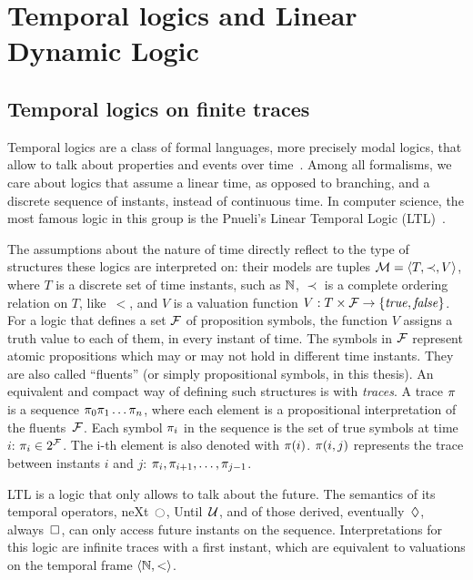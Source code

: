 \chapter{Temporal logics and Linear Dynamic Logic}

\section{Temporal logics on finite traces}

Temporal logics are a class of formal languages, more precisely modal logics,
that allow to talk about properties and events over
time~\cite{bib:temporal-logics-stanford}. Among all formalisms, we care about
logics that assume a linear time, as opposed to branching, and a discrete
sequence of instants, instead of continuous time.  In computer science, the
most famous logic in this group is the Pnueli's Linear Temporal Logic
(LTL)~\cite{bib:pnueli-ltl}.

The assumptions about the nature of time directly reflect to the type of
structures these logics are interpreted on: their models are tuples $\mathcal{M}
= \langle T, \prec, V \rangle$, where $T$ is a discrete set of time instants,
such as $\mathbb{N}$, $\prec$ is a complete ordering relation on $T$, like~$<$, and
$V$ is a valuation function $V: T \times \mathcal{F} \to \{\text{\textit{true}}, \text{\textit{false}}\}$. For
a logic that defines a set $\mathcal{F}$ of proposition symbols, the function $V$
assigns a truth value to each of them, in every instant of time. The symbols
in $\mathcal{F}$ represent atomic propositions which may or may not hold in
different time instants. They are also called ``fluents'' (or simply
propositional symbols, in this thesis). An equivalent and compact way of
defining such structures is with \emph{traces}. A trace $\pi$ is a sequence
$\pi_0 \pi_1 \dots \pi_n$, where each element is a propositional
interpretation of the fluents~$\mathcal{F}$. Each symbol $\pi_i$ in the
sequence is the set of true symbols at time~$i$: $\pi_i \in 2^{\mathcal{F}}$.
The i-th element is also denoted with $\pi(i)$. $\pi(i, j)$ represents
the trace between instants $i$ and $j$: $\pi_i, \pi_{i+1}, \dots,
\pi_{j-1}$.

LTL is a logic that only allows to talk about the future. The semantics of its
temporal operators, neXt~$\lnext$, Until~$\mathcal{U}$, and of those derived,
eventually~$\lozenge$, always~$\square$, can only access future instants on
the sequence. Interpretations for this logic are infinite traces with a first
instant, which are equivalent to valuations on the temporal frame $\langle \mathbb{N},
< \rangle$.

